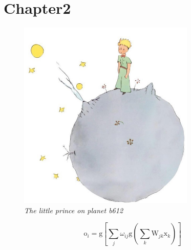 \section{Chapter2}
		\label{sec:chapter2}

	\lipsum[1]

	\begin{figure} [H]
	 \centering
	  \includegraphics[width=0.75\textwidth]{body/chapter2/images/princeplanet.jpg}
		\caption[The little prince on planet b612]{\centering \textit{The little prince on planet b612}}
	  \label{fig:1}
	\end{figure}

	\lipsum[5-7]

	\begin{equation}
	\mathrm o_i= \mathrm g \left[\sum_{j}\omega_{ij}\mathrm g\left(\sum_{k}\mathrm W_{jk}\mathrm x_k\right)\right]
	\label{eq:5}
	\end{equation}
\newpage

